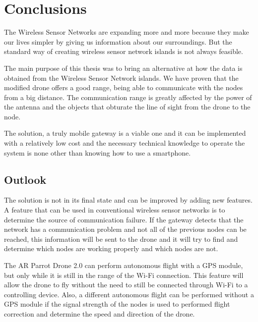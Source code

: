 \chapter{Conclusions}


The Wireless Sensor Networks are expanding more and more because they make our lives simpler by giving us information about our surroundings. But the standard way of creating wireless sensor network islands is not always feasible.

The main purpose of this thesis was to bring an alternative at how the data is obtained from the Wireless Sensor Network islands. We have proven that the modified drone offers a good range, being able to communicate with the nodes from a big distance. The communication range is greatly affected by the power of the antenna and the objects that obturate the line of sight from the drone to the node.


The solution, a truly mobile gateway is a viable one and it can be implemented with a relatively low cost and the necessary technical knowledge to operate the system is none other than knowing how to use a smartphone.




\section{Outlook}

The solution is not in its final state and can be improved by adding new features. A feature that can be used in conventional wireless sensor networks is to determine the source of communication failure. If the gateway detects that the network has a communication problem and not all of the previous nodes can be reached, this information will be sent to the drone and it will try to find and determine which nodes are working properly and which nodes are not.

The AR Parrot Drone 2.0 can perform autonomous flight with a GPS module, but only while it is still in the range of the Wi-Fi connection. This feature will allow the drone to fly without the need to still be connected through Wi-Fi to a controlling device. Also, a different autonomous flight can be performed without a GPS module if the signal strength of the nodes is used to performed flight correction and determine the speed and direction of the drone.

